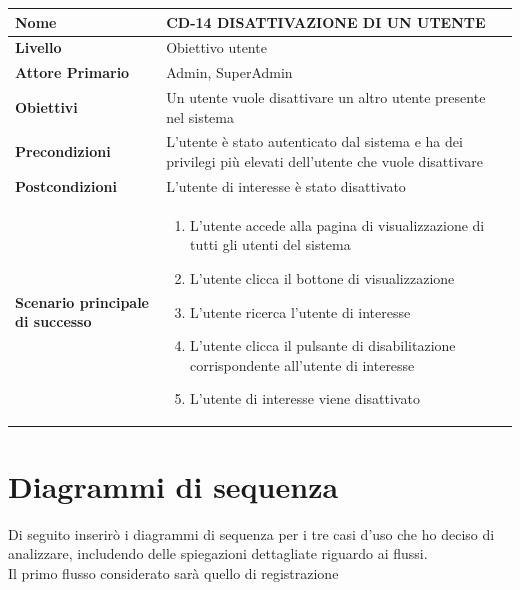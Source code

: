 \begin{center}
    \begin{tabular}{|p{0.3\linewidth}|p{0.7\linewidth}|}
    \hline
    \rowcolor{Blue}
    \textbf{Nome} & CD-14 DISATTIVAZIONE DI UN UTENTE \\
    \hline
    \rowcolor{DarkBlue}
    \textbf{Livello} & Obiettivo utente \\
    \hline
    \rowcolor{LightBlue}
    \textbf{Attore Primario} & Admin, SuperAdmin \\
    \hline
    \rowcolor{LightBlue}
    \textbf{Obiettivi} & Un utente vuole disattivare un altro utente presente nel sistema \\
    \hline
    \rowcolor{Blue}
    \textbf{Precondizioni} & L’utente è stato autenticato dal sistema e ha dei privilegi più elevati dell’utente che vuole disattivare \\
    \hline
    \rowcolor{LightBlue}
    \textbf{Postcondizioni} & L’utente di interesse è stato disattivato \\
    \hline
    \rowcolor{LighterBlue}
        \begin{center}
        \textbf{Scenario principale di successo}
    \end{center} 
    &
    \begin{enumerate}
        \item L’utente accede alla pagina di visualizzazione di tutti gli utenti del sistema
        \item L’utente clicca il bottone di visualizzazione
        \item L’utente ricerca l’utente di interesse
        \item L’utente clicca il pulsante di disabilitazione corrispondente all’utente di interesse
        \item L’utente di interesse viene disattivato
    \end{enumerate}
    \\
    \hline
    \end{tabular}
\end{center}



\section{Diagrammi di sequenza}
Di seguito inserirò i diagrammi di sequenza per i tre casi d'uso che ho deciso di analizzare, includendo delle spiegazioni dettagliate riguardo ai flussi.
\\
Il primo flusso considerato sarà quello di registrazione

